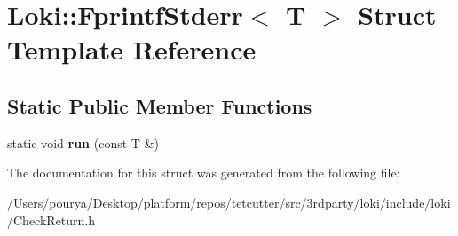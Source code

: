 \hypertarget{structLoki_1_1FprintfStderr}{}\section{Loki\+:\+:Fprintf\+Stderr$<$ T $>$ Struct Template Reference}
\label{structLoki_1_1FprintfStderr}
\subsection*{Static Public Member Functions}
\begin{DoxyCompactItemize}
\item 
\hypertarget{structLoki_1_1FprintfStderr_a8f640690323654d3684a792a7fa0263f}{}static void {\bfseries run} (const T \&)\label{structLoki_1_1FprintfStderr_a8f640690323654d3684a792a7fa0263f}

\end{DoxyCompactItemize}


The documentation for this struct was generated from the following file\+:\begin{DoxyCompactItemize}
\item 
/\+Users/pourya/\+Desktop/platform/repos/tetcutter/src/3rdparty/loki/include/loki/Check\+Return.\+h\end{DoxyCompactItemize}

